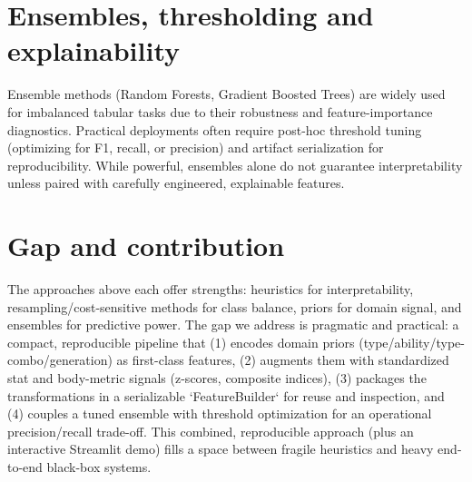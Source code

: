 \section{Ensembles, thresholding and explainability}

Ensemble methods (Random Forests, Gradient Boosted Trees) are widely used for imbalanced tabular tasks due to their robustness and feature-importance diagnostics. Practical deployments often require post-hoc threshold tuning (optimizing for F1, recall, or precision) and artifact serialization for reproducibility. While powerful, ensembles alone do not guarantee interpretability unless paired with carefully engineered, explainable features.

\section{Gap and contribution}

The approaches above each offer strengths: heuristics for interpretability, resampling/cost-sensitive methods for class balance, priors for domain signal, and ensembles for predictive power. The gap we address is pragmatic and practical: a compact, reproducible pipeline that (1) encodes domain priors (type/ability/type-combo/generation) as first-class features, (2) augments them with standardized stat and body-metric signals (z-scores, composite indices), (3) packages the transformations in a serializable `FeatureBuilder` for reuse and inspection, and (4) couples a tuned ensemble with threshold optimization for an operational precision/recall trade-off. This combined, reproducible approach (plus an interactive Streamlit demo) fills a space between fragile heuristics and heavy end-to-end black-box systems.
